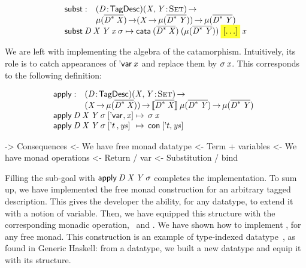 \[\stk{
\begin{array}{@{}ll}
\subst : & \PITEL{\V{D}}{\TagDesc}
           \PI{\V{X}, \V{Y}}{\Set} \\
         & \Mu{(\toDesc{\FreeMonad{\V{D}}{\V{X}}})} \To
           (\V{X} \To \Mu{(\toDesc{\FreeMonad{\V{D}}{\V{Y}}})}) \To
           \Mu{(\toDesc{\FreeMonad{\V{D}}{\V{Y}}})} 
\end{array} \\
\subst\: \V{D}\: \V{X}\: \V{Y}\: \V{x}\: \V{\sigma} \mapsto
  \cata\: (\toDesc{\FreeMonad{\V{D}}{\V{X}}})\: 
          (\Mu{(\toDesc{\FreeMonad{\V{D}}{\V{Y}}})})\: 
          \SHED\: 
          \V{x}
}\]

We are left with implementing the algebra of the
catamorphism. Intuitively, its role is to catch appearances of
$\DVar{\V{x}}$ and replace them by $\V{\sigma}\: \V{x}$. This
corresponds to the following definition:

\[\stk{
\begin{array}{@{}ll}
\apply : & \PITEL{\V{D}}{\TagDesc} 
           \PI{\V{X}, \V{Y}}{\Set} \\
         & (\V{X} \To \Mu{(\toDesc{\FreeMonad{\V{D}}{\V{X}}})}) \To
           \descop{\toDesc{\FreeMonad{\V{D}}{\V{X}}}}{\Mu{(\toDesc{\FreeMonad{\V{D}}{\V{Y}}})}} \To
           \Mu{(\toDesc{\FreeMonad{\V{D}}{\V{Y}}})}
\\
\end{array} \\
\begin{array}{@{}l@{\:\mapsto\:\:}l}
\apply\: \V{D}\: \V{X}\: \V{Y}\: \V{\sigma}\: \pair{\DVar{\!}}{\V{x}}{}   & \V{\sigma}\: \V{x}                   \\
\apply\: \V{D}\: \V{X}\: \V{Y}\: \V{\sigma}\: \pair{\etag{t}\,}{\V{ys}}{} & \Con{\pair{\etag{t}}{\V{ys}}{}}
\end{array}
}\]

\begin{wstructure}
    -> Consequences
        <- We have free monad datatype
            <- Term + variables
        <- We have monad operations
            <- Return / var
            <- Substitution / bind
\end{wstructure}

Filling the sub-goal with $\apply\: \V{D}\: \V{X}\: \V{Y}\:
\V{\sigma}$ completes the implementation. To sum up, we have
implemented the free monad construction for an arbitrary tagged
description. This gives the developer the ability, for any datatype,
to extend it with a notion of variable. Then, we have equipped this
structure with the corresponding monadic operation, \bind\ and
\return. We have shown how to implement \bind, for any free
monad. This construction is an example of type-indexed
datatype~\cite{hinze:generic-haskell}, as found in Generic Haskell:
from a datatype, we built a new datatype and equip it with its
structure.

